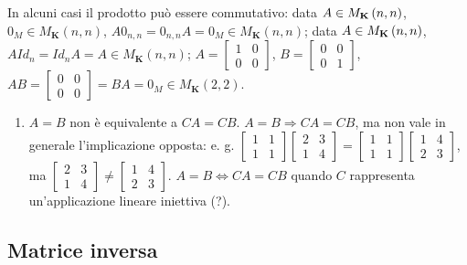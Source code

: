 \documentclass{article}
\begin{document}
In alcuni casi il prodotto pu\`{o} essere commutativo: data $A\in M_{\mathbf{%
K}}\left( n,n\right) $, $0_{M}\in M_{\mathbf{K}}\left( n,n\right) $, $%
A0_{n,n}=0_{n,n}A=0_{M}\in M_{\mathbf{K}}\left( n,n\right) $; data $A\in M_{%
\mathbf{K}}\left( n,n\right) $, $AId_{n}=Id_{n}A=A\in M_{\mathbf{K}}\left(
n,n\right) $; $A=\left[ 
\begin{array}{cc}
1 & 0 \\ 
0 & 0%
\end{array}%
\right] $, $B=\left[ 
\begin{array}{cc}
0 & 0 \\ 
0 & 1%
\end{array}%
\right] $, $AB=\left[ 
\begin{array}{cc}
0 & 0 \\ 
0 & 0%
\end{array}%
\right] =BA=0_{M}\in M_{\mathbf{K}}\left( 2,2\right) $.

\begin{enumerate}
\item $A=B$ non \`{e} equivalente a $CA=CB$. $A=B\Longrightarrow CA=CB$, ma
non vale in generale l'implicazione opposta: e. g. $\left[ 
\begin{array}{cc}
1 & 1 \\ 
1 & 1%
\end{array}%
\right] \left[ 
\begin{array}{cc}
2 & 3 \\ 
1 & 4%
\end{array}%
\right] =\left[ 
\begin{array}{cc}
1 & 1 \\ 
1 & 1%
\end{array}%
\right] \left[ 
\begin{array}{cc}
1 & 4 \\ 
2 & 3%
\end{array}%
\right] $, ma $\left[ 
\begin{array}{cc}
2 & 3 \\ 
1 & 4%
\end{array}%
\right] \neq \left[ 
\begin{array}{cc}
1 & 4 \\ 
2 & 3%
\end{array}%
\right] $. $A=B\Longleftrightarrow CA=CB$ quando $C$ rappresenta
un'applicazione lineare iniettiva (?).
\end{enumerate}

\subsection{Matrice inversa}
\end{document}
